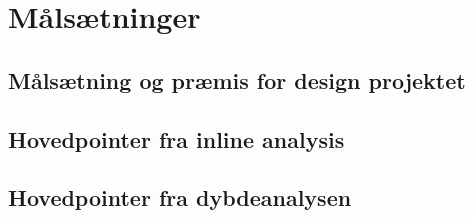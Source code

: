 \section{Målsætninger}
\subsection{Målsætning og præmis for design projektet}
\subsection{Hovedpointer fra inline analysis}
\subsection{Hovedpointer fra dybdeanalysen}